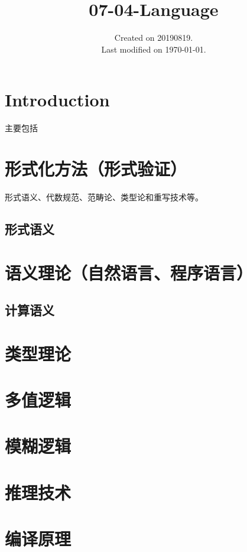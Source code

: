 \documentclass[UTF8]{../computerUniverse}
\begin{document}
\title{07-04-Language}
\date{Created on 20190819.\\   Last modified on \today.}
\maketitle
\tableofcontents


\chapter{Introduction}

主要包括


\chapter{形式化方法（形式验证）}
形式语义、代数规范、范畴论、类型论和重写技术等。
\section{形式语义}


\chapter{语义理论（自然语言、程序语言）}


\section{计算语义}


\chapter{类型理论}

\chapter{多值逻辑}
\chapter{模糊逻辑}
\chapter{推理技术}





\chapter{编译原理}
\end{document}
